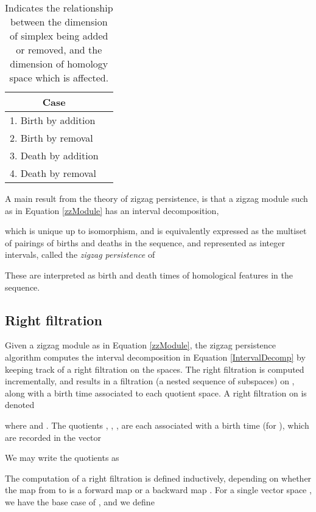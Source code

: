 \documentclass[12pt]{article}
\begin{document}
\vspace{2mm}
\begin{table}
\begin{center}
\begin{tabular}{|l|c|}
\hline
\multicolumn{1}{|c|}{Case} &  \\
\hline
1. Birth by addition &  \\
2. Birth by removal &  \\
3. Death by addition &  \\
4. Death by removal &  \\
\hline
\end{tabular}
\caption{Indicates the relationship between the dimension  of simplex  being added or removed, and the dimension of homology space which is affected. \label{DimTable}}
\end{center}
\end{table}
\vspace{2mm}

A main result from the theory of zigzag persistence, is that a zigzag module such as in Equation \ref{zzModule} has an interval decomposition,


which is unique up to isomorphism, and is equivalently expressed as the multiset of pairings of births and deaths in the sequence, and represented as integer intervals, called the \emph{zigzag persistence} of  \cite{carlsson2010}


These are interpreted as birth and death times of homological features in the sequence.

\subsection{Right filtration}

Given a zigzag module  as in Equation \ref{zzModule}, the zigzag persistence algorithm \cite{carlsson2009b} computes the interval decomposition in Equation \ref{IntervalDecomp} by keeping track of a right filtration  on the spaces. The right filtration  is computed incrementally, and results in a filtration (a nested sequence of subspaces) on , along with a birth time associated to each quotient space. A right filtration on  is denoted


where  and . The quotients , , ,  are each associated with a birth time  (for ), which are recorded in the vector



We may write the quotients as

The computation of a right filtration is defined inductively, depending on whether the map from  to  is a forward map  or a backward map . For a single vector space , we have the base case of , and we define
\end{document}
